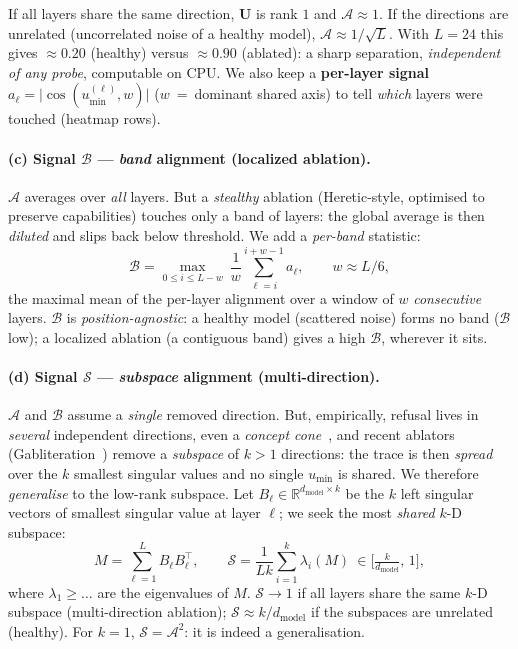 \documentclass[11pt,a4paper]{article}
\theoremstyle{definition}
\theoremstyle{plain}
\newcommand{\R}{\mathbb{R}}
\newcommand{\dmodel}{d_{\text{model}}}
\begin{document}
\begin{intuition}
If all layers share the same direction, $\mathbf{U}$ is rank $1$ and
$\mathcal{A}\approx 1$. If the directions are unrelated (uncorrelated noise of a
healthy model), $\mathcal{A}\approx 1/\sqrt{L}$. With $L=24$ this gives $\approx 0.20$
(healthy) versus $\approx 0.90$ (ablated): a sharp separation, \emph{independent of
any probe}, computable on CPU. We also keep a \textbf{per-layer signal}
$a_\ell=\lvert\cos(u_{\min}^{(\ell)},w)\rvert$ ($w$~=~dominant shared axis) to tell
\emph{which} layers were touched (heatmap rows).
\end{intuition}

\paragraph{(c) Signal $\mathcal{B}$ — \emph{band} alignment (localized ablation).}
$\mathcal{A}$ averages over \emph{all} layers. But a \emph{stealthy} ablation
(Heretic-style, optimised to preserve capabilities) touches only a band of layers:
the global average is then \emph{diluted} and slips back below threshold. We add a
\emph{per-band} statistic:
\begin{equation}\label{eq:band}
  \mathcal{B}=\max_{0\le i\le L-w}\ \frac1w\sum_{\ell=i}^{i+w-1} a_\ell ,
  \qquad w\approx L/6 ,
\end{equation}
the maximal mean of the per-layer alignment over a window of $w$ \emph{consecutive}
layers. $\mathcal{B}$ is \emph{position-agnostic}: a healthy model (scattered noise)
forms no band ($\mathcal{B}$ low); a localized ablation (a contiguous band) gives a
high $\mathcal{B}$, wherever it sits.

\paragraph{(d) Signal $\mathcal{S}$ — \emph{subspace} alignment (multi-direction).}
$\mathcal{A}$ and $\mathcal{B}$ assume a \emph{single} removed direction. But,
empirically, refusal lives in \emph{several} independent directions, even a
\emph{concept cone}~\cite{wollschlager2025,piras2025}, and recent ablators
(Gabliteration~\cite{gabliteration}) remove a \emph{subspace} of $k>1$
directions: the trace is then \emph{spread} over the $k$ smallest singular values and
no single $u_{\min}$ is shared. We therefore \emph{generalise} to the low-rank
subspace. Let $B_\ell\in\R^{\dmodel\times k}$ be the $k$ left singular vectors of
smallest singular value at layer $\ell$; we seek the most \emph{shared} $k$-D
subspace:
\begin{equation}\label{eq:subspace}
  M=\sum_{\ell=1}^{L} B_\ell B_\ell^\top,\qquad
  \mathcal{S}=\frac{1}{Lk}\sum_{i=1}^{k}\lambda_i(M)\ \in\Big[\tfrac{k}{\dmodel},\,1\Big],
\end{equation}
where $\lambda_1\ge\dots$ are the eigenvalues of $M$. $\mathcal{S}\to 1$ if all layers
share the same $k$-D subspace (multi-direction ablation);
$\mathcal{S}\approx k/\dmodel$ if the subspaces are unrelated (healthy). For $k=1$,
$\mathcal{S}=\mathcal{A}^2$: it is indeed a generalisation.
\end{document}
